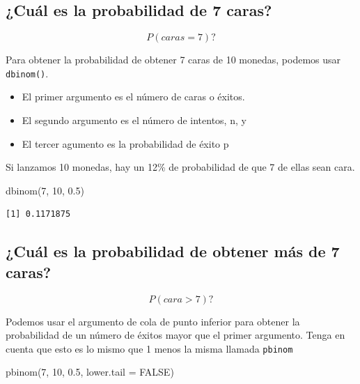 \documentclass[
  letterpaper,
  DIV=11,
  numbers=noendperiod]{scrreprt}
\newenvironment{Shaded}{\begin{snugshade}}{\end{snugshade}}
\newcommand{\AttributeTok}[1]{\textcolor[rgb]{0.40,0.45,0.13}{#1}}
\newcommand{\ConstantTok}[1]{\textcolor[rgb]{0.56,0.35,0.01}{#1}}
\newcommand{\DecValTok}[1]{\textcolor[rgb]{0.68,0.00,0.00}{#1}}
\newcommand{\FloatTok}[1]{\textcolor[rgb]{0.68,0.00,0.00}{#1}}
\newcommand{\FunctionTok}[1]{\textcolor[rgb]{0.28,0.35,0.67}{#1}}
\newcommand{\NormalTok}[1]{\textcolor[rgb]{0.00,0.23,0.31}{#1}}
\begin{document}
\hypertarget{cuuxe1l-es-la-probabilidad-de-7-caras}{%
\subsection{¿Cuál es la probabilidad de 7
caras?}\label{cuuxe1l-es-la-probabilidad-de-7-caras}}

\[
P(caras = 7)?
\]

Para obtener la probabilidad de obtener 7 caras de 10 monedas, podemos
usar \texttt{dbinom()}.

\begin{itemize}
\item
  El primer argumento es el número de caras o éxitos.
\item
  El segundo argumento es el número de intentos, n, y
\item
  El tercer agumento es la probabilidad de éxito p
\end{itemize}

Si lanzamos 10 monedas, hay un 12\% de probabilidad de que 7 de ellas
sean cara.

\begin{Shaded}
\begin{Highlighting}[]
\FunctionTok{dbinom}\NormalTok{(}\DecValTok{7}\NormalTok{, }\DecValTok{10}\NormalTok{, }\FloatTok{0.5}\NormalTok{)}
\end{Highlighting}
\end{Shaded}

\begin{verbatim}
[1] 0.1171875
\end{verbatim}

\hypertarget{cuuxe1l-es-la-probabilidad-de-obtener-muxe1s-de-7-caras}{%
\subsection{¿Cuál es la probabilidad de obtener más de 7
caras?}\label{cuuxe1l-es-la-probabilidad-de-obtener-muxe1s-de-7-caras}}

\[
P(cara > 7)?
\]

Podemos usar el argumento de cola de punto inferior para obtener la
probabilidad de un número de éxitos mayor que el primer argumento. Tenga
en cuenta que esto es lo mismo que 1 menos la misma llamada
\texttt{pbinom}

\begin{Shaded}
\begin{Highlighting}[]
\FunctionTok{pbinom}\NormalTok{(}\DecValTok{7}\NormalTok{, }\DecValTok{10}\NormalTok{, }\FloatTok{0.5}\NormalTok{, }\AttributeTok{lower.tail =} \ConstantTok{FALSE}\NormalTok{)}
\end{Highlighting}
\end{Shaded}
\end{document}
